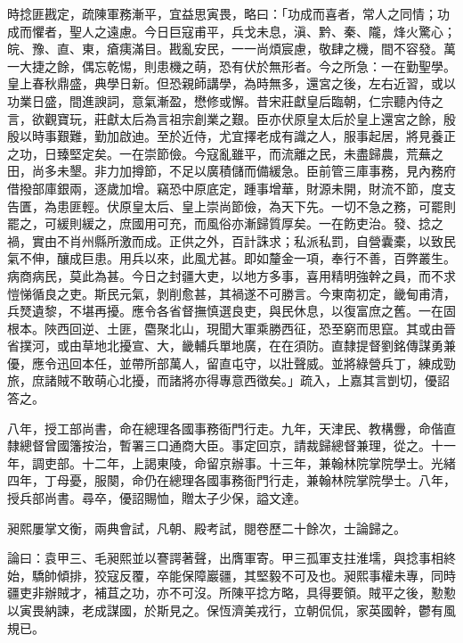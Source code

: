 \begin{pinyinscope}
時捻匪戡定，疏陳軍務漸平，宜益思寅畏，略曰：「功成而喜者，常人之同情；功成而懼者，聖人之遠慮。今日巨寇甫平，兵戈未息，滇、黔、秦、隴，烽火驚心；皖、豫、直、東，瘡痍滿目。戡亂安民，一一尚煩宸慮，敬肆之機，間不容發。萬一大捷之餘，偶忘乾惕，則患機之萌，恐有伏於無形者。今之所急：一在勤聖學。皇上春秋鼎盛，典學日新。但恐親師講學，為時無多，還宮之後，左右近習，或以功業日盛，間進諛詞，意氣漸盈，懋修或懈。昔宋莊獻皇后臨朝，仁宗聽內侍之言，欲觀寶玩，莊獻太后為言祖宗創業之艱。臣亦伏原皇太后於皇上還宮之餘，殷殷以時事艱難，勤加啟迪。至於近侍，尤宜擇老成有識之人，服事起居，將見養正之功，日臻堅定矣。一在崇節儉。今寇亂雖平，而流離之民，未盡歸農，荒蕪之田，尚多未墾。非力加撙節，不足以廣積儲而備緩急。臣前管三庫事務，見內務府借撥部庫銀兩，逐歲加增。竊恐中原底定，踵事增華，財源未開，財流不節，度支告匱，為患匪輕。伏原皇太后、皇上崇尚節儉，為天下先。一切不急之務，可罷則罷之，可緩則緩之，庶國用可充，而風俗亦漸歸質厚矣。一在飭吏治。發、捻之禍，實由不肖州縣所激而成。正供之外，百計誅求；私派私罰，自營囊橐，以致民氣不伸，釀成巨患。用兵以來，此風尤甚。即如釐金一項，奉行不善，百弊叢生。病商病民，莫此為甚。今日之封疆大吏，以地方多事，喜用精明強幹之員，而不求愷悌循良之吏。斯民元氣，剝削愈甚，其禍遂不可勝言。今東南初定，畿甸甫清，兵燹遺黎，不堪再擾。應令各省督撫慎選良吏，與民休息，以復富庶之舊。一在固根本。陜西回逆、土匪，麕聚北山，現聞大軍乘勝西征，恐至窮而思竄。其或由晉省撲河，或由草地北擾宣、大，畿輔兵單地廣，在在須防。直隸提督劉銘傳謀勇兼優，應令迅回本任，並帶所部萬人，留直屯守，以壯聲威。並將綠營兵丁，練成勁旅，庶諸賊不敢萌心北擾，而諸將亦得專意西徵矣。」疏入，上嘉其言剴切，優詔答之。

八年，授工部尚書，命在總理各國事務衙門行走。九年，天津民、教構釁，命偕直隸總督曾國籓按治，暫署三口通商大臣。事定回京，請裁歸總督兼理，從之。十一年，調吏部。十二年，上謁東陵，命留京辦事。十三年，兼翰林院掌院學士。光緒四年，丁母憂，服闋，命仍在總理各國事務衙門行走，兼翰林院掌院學士。八年，授兵部尚書。尋卒，優詔賜恤，贈太子少保，謚文達。

昶熙屢掌文衡，兩典會試，凡朝、殿考試，閱卷歷二十餘次，士論歸之。

論曰：袁甲三、毛昶熙並以謇諤著聲，出膺軍寄。甲三孤軍支拄淮壖，與捻事相終始，驕帥傾排，狡寇反覆，卒能保障巖疆，其堅毅不可及也。昶熙事權未專，同時疆吏非辦賊才，補苴之功，亦不可沒。所陳平捻方略，具得要領。賊平之後，懃懃以寅畏納諫，老成謀國，於斯見之。保恆濟美戎行，立朝侃侃，家英國幹，鬱有風規已。


\end{pinyinscope}